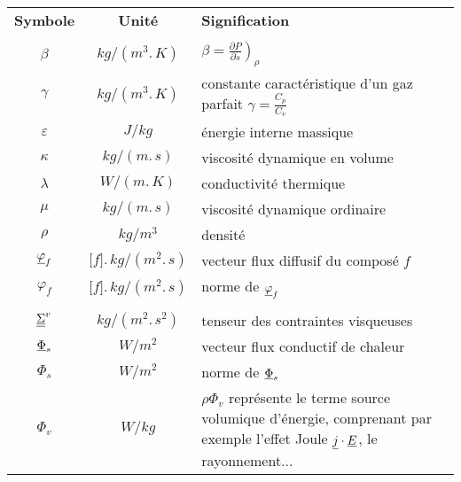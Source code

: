 \newpage

\begin{table}[htp]
\begin{tabular}{ccp{}}

{\bf Symbole} & {\bf Unité} & {\bf Signification}\\

\phantom{$C_v$, ${C_v}_i$} & \phantom{$\lbrack f\rbrack.\,kg/(m^3.\,s)$} & \\

$\beta$         & $kg/(m^3.\,K)$ &
        $\beta = \left.\frac{\partial P}{\partial s}\right)_\rho$\\
$\gamma$         & $kg/(m^3.\,K)$ & constante caractéristique
                                        d'un gaz parfait
                                        $\gamma = \frac{C_p}{C_v}$\\
$\varepsilon$         & $J/kg$         & énergie interne massique\\
$\kappa$         & $kg/(m.\,s)$         & viscosité dynamique en volume\\
$\lambda$         & $W/(m.\,K)$         & conductivité thermique\\
$\mu$                 & $kg/(m.\,s)$         & viscosité dynamique ordinaire\\
$\rho$                 & $kg/m^3$         & densité\\
$\underline{\varphi}_f$
                & $\lbrack f\rbrack.\,kg/(m^2.\,s)$
                                & vecteur flux diffusif du composé $f$\\
$\varphi_f$         & $\lbrack f\rbrack.\,kg/(m^2.\,s)$
                                & norme de $\underline{\varphi}_f$\\

\phantom{ouden}        &                 & \\

$\underline{\underline{\Sigma}}^v$ &$kg/(m^2.\,s^2)$& tenseur des contraintes visqueuses\\
$\underline{\Phi}_s$ & $W/m^2$        & vecteur flux conductif de chaleur\\
$\Phi_s$         & $W/m^2$         & norme de $\underline{\Phi}_s$\\
$\Phi_v$         & $W/kg$         & $\rho\Phi_v$ représente le terme
                                        source volumique d'énergie,
                                        comprenant par exemple
                                        l'effet Joule $\underline{j}\cdot\underline{E}$,
                                        le rayonnement...\\
\end{tabular}
\end{table}
\clearpage

